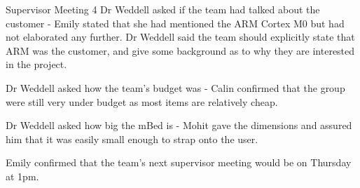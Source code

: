 \documentclass{article}
\begin{document}
\begin{Minutes}{Supervisor Meeting 4}
Dr Weddell asked if the team had talked about the customer - Emily stated that she had mentioned the ARM Cortex M0 but had not elaborated any further.
Dr Weddell said the team should explicitly state that ARM was the customer, and give some background as to why they are interested in the project.


Dr Weddell asked how the team's budget was - Calin confirmed that the group were still very under budget as most items are relatively cheap.

Dr Weddell asked how big the mBed is - Mohit gave the dimensions and assured him that it was easily small enough to strap onto the user.

Emily confirmed that the team's next supervisor meeting would be on Thursday at 1pm.

\end{Minutes}
\end{document}
